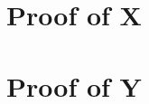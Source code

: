 \documentclass{article}
\begin{document}
\section{Proof of X}

\section{Proof of Y}


\nocite{*}

\end{document}
